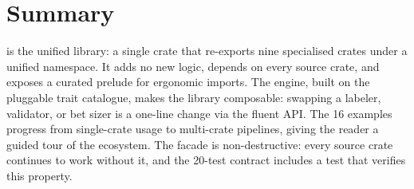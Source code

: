\section{Summary}

 is the unified library: a
single crate that re-exports nine specialised crates under a unified
namespace. It adds no new logic, depends on every source crate, and
exposes a curated prelude for ergonomic imports. The
 engine, built on the pluggable trait
catalogue, makes the library composable: swapping a labeler,
validator, or bet sizer is a one-line change via the
 fluent API. The 16 examples progress from
single-crate usage to multi-crate pipelines, giving the reader a
guided tour of the ecosystem. The facade is non-destructive: every
source crate continues to work without it, and the 20-test contract
includes a test that verifies this property.